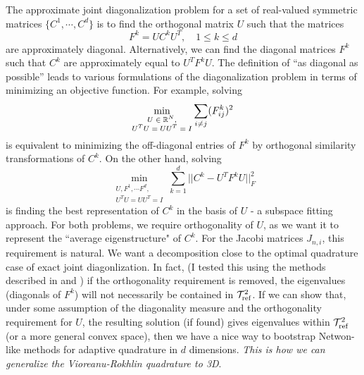 The approximate joint diagonalization problem for a set of real-valued symmetric matrices $\{C^1,\cdots,C^d\}$ is to find the orthogonal matrix $U$ such that the matrices 
\begin{equation}
	F^k = UC^kU^T, \quad 1\leq k \leq d
\end{equation}
are approximately diagonal. Alternatively, we can find the diagonal matrices $F^k$ such that $C^k$ are approximately equal to $U^TF^kU$. The definition of ``as diagonal as possible'' leads to various formulations of the diagonalization problem in terms of minimizing an objective function. For example, solving
\begin{equation}
	\min_{\substack{\text{$U\in \mathbb{R}^N$},\\ \text{$U^TU=UU^T=I$}}}\sum_{i\neq j}(F^k_{ij})^2
\end{equation}
is equivalent to minimizing the off-diagonal entries of $F^k$ by orthogonal similarity transformations of $C^k$. On the other hand, solving
\begin{equation}
	\min_{\substack{\text{$U,F^1,\cdots F^d$},\\ \text{$U^TU=UU^T=I$}}} \sum_{k=1}^d \big|\big|C^k-U^TF^k U\big|\big|_F^2
\end{equation}
is finding the best representation of $C^k$ in the basis of $U$ - a subspace fitting approach. For both problems, we require orthogonality of $U$, as we want it to represent the ``average eigenstructure" of $C^k$. For the Jacobi matrices $J_{n,i}$, this requirement is natural. We want a decomposition close to the optimal quadrature case of exact joint diagonlization. In fact, (I tested this using the methods described in \cite{bss} and \cite{jevd}) if the orthogonality requirement is removed, the eigenvalues (diagonals of $F^k$) will not necessarily be contained in $\mathcal{T}_{\text{ref}}^2$. \color{red} If we can show that, under some assumption of the diagonality measure and the orthogonality requirement for $U$, the resulting solution (if found) gives eigenvalues within $\mathcal{T}_{\text{ref}}^2$ (or a more general convex space), then we have a nice way to bootstrap Netwon-like methods for adaptive quadrature in $d$ dimensions.\color{black} \emph{ This is how we can generalize the Vioreanu-Rokhlin quadrature to 3D}.


